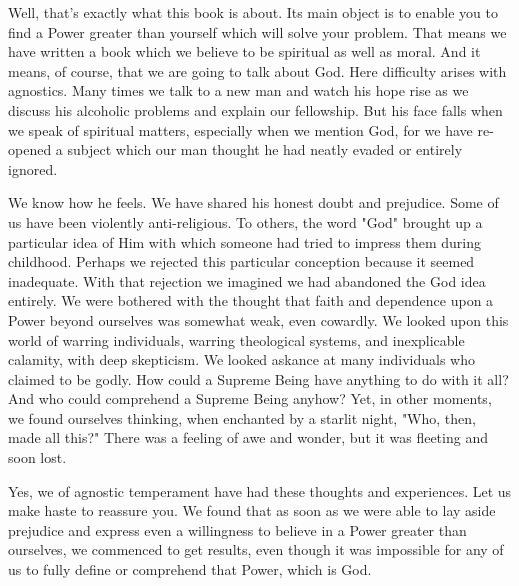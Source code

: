 \begin{biblechapter}
    Well, that's exactly what this book is about. 
\verse Its main object is to enable you 
    to find a Power greater than yourself 
    which will solve your problem. 
\verse That means we have written a book 
    which we believe to be spiritual as well as moral. 
\verse And it means, of course, that we are going to talk about God. 
\verse Here difficulty arises with agnostics. 
\verse Many times we talk to a new man and watch his hope rise 
    as we discuss his alcoholic problems and explain our fellowship. 
    But his face falls when we speak of spiritual matters, 
    especially when we mention God, 
    for we have re-opened a subject 
    which our man thought he had neatly evaded 
    or entirely ignored.

\verse We know how he feels. 
\verse We have shared his honest doubt and prejudice. 
\verse Some of us have been violently anti-religious. 
\verse To others, 
    the word "God" brought up a particular idea of Him 
    with which someone had tried to impress them during childhood. 
\verse Perhaps we rejected this particular conception 
    because it seemed inadequate. 
\verse With that rejection 
    we imagined we had abandoned the God idea entirely.
\verse We were bothered with the thought 
    that faith and dependence upon a Power beyond ourselves 
    was somewhat weak, even cowardly. 
    We looked upon this world 
    of warring individuals, 
    warring theological systems, 
    and inexplicable calamity, 
    with deep skepticism. 
\verse We looked askance at many individuals who claimed to be godly. 
\verse How could a Supreme Being have anything to do with it all? 
\verse And who could comprehend a Supreme Being anyhow? 
\verse Yet, in other moments, we found ourselves thinking, 
    when enchanted by a starlit night, 
\verse "Who, then, made all this?" 
\verse There was a feeling of awe and wonder, 
    but it was fleeting and soon lost.

\verse Yes, we of agnostic temperament 
    have had these thoughts and experiences. 
\verse Let us make haste to reassure you. 
\verse We found that as soon as we were able to lay aside prejudice 
    and express even a willingness to believe 
    in a Power greater than ourselves, 
    we commenced to get results, 
    even though it was impossible for any of us to fully define 
    or comprehend that Power, 
    which is God.
\end{biblechapter}


